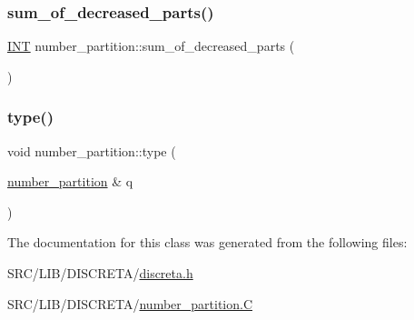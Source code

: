 \mbox{\label{classnumber__partition_ac1f48644e28737706fb6b04f7381da05}} 
\subsubsection{\texorpdfstring{sum\+\_\+of\+\_\+decreased\+\_\+parts()}{sum\_of\_decreased\_parts()}}
{\footnotesize\ttfamily \mbox{\hyperlink{galois_8h_a09fddde158a3a20bd2dcadb609de11dc}{I\+NT}} number\+\_\+partition\+::sum\+\_\+of\+\_\+decreased\+\_\+parts (\begin{DoxyParamCaption}{ }\end{DoxyParamCaption})}

\mbox{\label{classnumber__partition_a0f194ccc525edcb22249744c3b0c65cb}} 
\subsubsection{\texorpdfstring{type()}{type()}}
{\footnotesize\ttfamily void number\+\_\+partition\+::type (\begin{DoxyParamCaption}\item[{\mbox{\hyperlink{classnumber__partition}{number\+\_\+partition}} \&}]{q }\end{DoxyParamCaption})}



The documentation for this class was generated from the following files\+:\begin{DoxyCompactItemize}
\item 
S\+R\+C/\+L\+I\+B/\+D\+I\+S\+C\+R\+E\+T\+A/\mbox{\hyperlink{discreta_8h}{discreta.\+h}}\item 
S\+R\+C/\+L\+I\+B/\+D\+I\+S\+C\+R\+E\+T\+A/\mbox{\hyperlink{number__partition_8_c}{number\+\_\+partition.\+C}}\end{DoxyCompactItemize}
